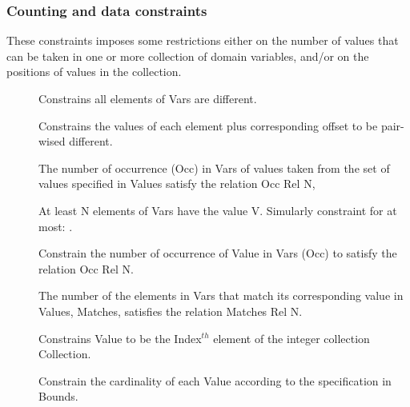 \subsubsection{Counting and data constraints}

These constraints imposes some restrictions either on the number of
 values that can be taken in one or more collection of domain
 variables, and/or on the positions of values in the collection.
\begin{description}
\item[]
Constrains all elements of Vars are different.

\item[]
Constrains the values of each element plus corresponding offset to be pair-wised different.

\item[]
The number of occurrence (Occ) in Vars of values taken from the set of
values specified in Values satisfy  the relation Occ Rel N,

\item[]
At least N elements of Vars have the value V. Simularly constraint for 
at most:
.

\item[]
Constrain the number of occurrence of Value in Vars (Occ) to satisfy
the relation Occ Rel N.

\item[]
The number of the elements in Vars that
 match its corresponding value in Values, Matches, satisfies the
 relation Matches Rel N.

\item[]
Constrains Value to be the Index$^{th}$ element of the integer collection Collection.
 
\item[]
Constrain the cardinality of each Value according to the specification
in Bounds.


\end{description}
